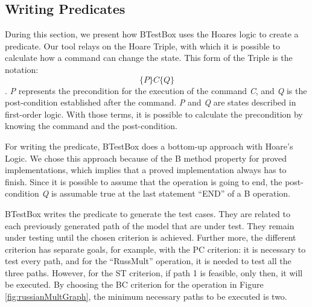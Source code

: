 \documentclass[runningheads]{llncs}
\begin{document}
\subsection{Writing Predicates} \label{writingPredicates}

During this section, we present how BTestBox uses the Hoare\textquotesingle s logic to create a predicate. Our tool relays on the Hoare Triple, with which it is possible to calculate how a command can change the state. 
This form of the Triple is the notation: \nolinebreak[4]
\noindent $${\displaystyle \{P\} C \{Q\} }$$ \nolinebreak[4]
\noindent. 
\textit{P} represents the precondition for the execution of the command \textit{C}, and \textit{Q} is the post-condition established after the command. \textit{P} and \textit{Q} are states described in first-order logic. With those terms, it is possible to calculate the precondition by knowing the command and the post-condition. 

For writing the predicate, BTestBox does a bottom-up approach with Hoare's Logic. We chose this approach because of the B method property for proved implementations, which implies that a proved implementation always has to finish. Since it is possible to assume that the operation is going to end, the post-condition \textit{Q} is assumable true at the last statement ``END'' of a B operation.


 BTestBox writes the predicate to generate the test cases. They are related to each previously generated path of the model that are under test. They remain under testing until the chosen criterion is achieved. Further more, the different criterion has separate goals, for example, with the PC criterion: it is necessary to test every path, and for the ``RussMult'' operation, it is needed to test all the three paths. However, for the ST criterion, if path 1 is feasible, only then, it will be executed. By choosing the BC criterion for the operation in Figure \ref{fig:russianMultGraph}, the minimum necessary paths to be executed is two.
\end{document}
